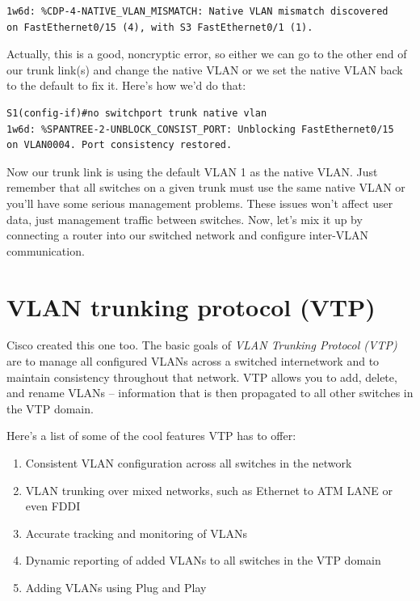 \documentclass[b5paper,11pt]{memoir}
\begin{document}
\begin{verbatim}
1w6d: %CDP-4-NATIVE_VLAN_MISMATCH: Native VLAN mismatch discovered
on FastEthernet0/15 (4), with S3 FastEthernet0/1 (1).
\end{verbatim}

Actually, this is a good, noncryptic error, so either we can go to the
other end of our trunk link(s) and change the native VLAN or we set the
native VLAN back to the default to fix it. Here's how we'd do that:

\begin{verbatim}
S1(config-if)#no switchport trunk native vlan
1w6d: %SPANTREE-2-UNBLOCK_CONSIST_PORT: Unblocking FastEthernet0/15
on VLAN0004. Port consistency restored.
\end{verbatim}

Now our trunk link is using the default VLAN 1 as the native VLAN.
Just remember that all switches on a given trunk must use the same native VLAN or you'll have some serious management problems.
These issues won't affect user data, just management traffic between switches.
Now, let's mix it up by connecting a router into our switched network and configure inter-VLAN communication.




\section{VLAN trunking protocol (VTP)}

Cisco created this one too. The basic goals of \emph{VLAN Trunking
Protocol (VTP)} are to manage all configured VLANs across a switched
internetwork and to maintain consistency throughout that network. VTP
allows you to add, delete, and rename VLANs -- information that is then
propagated to all other switches in the VTP domain.

Here's a list of some of the cool features VTP has to offer:

\begin{enumerate}
\tightlist
\item
  Consistent VLAN configuration across all switches in the network
\item
  VLAN trunking over mixed networks, such as Ethernet to ATM LANE or
  even FDDI
\item
  Accurate tracking and monitoring of VLANs
\item
  Dynamic reporting of added VLANs to all switches in the VTP domain
\item
  Adding VLANs using Plug and Play
\end{enumerate}
\end{document}

